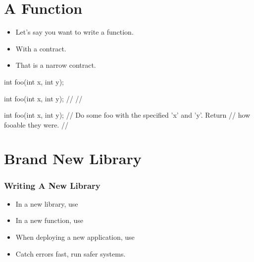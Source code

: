 \section{A Function}


\begin{frame}[fragile]
\begin{overprint}
  \begin{itemize}
  \item<1->{Let's say you want to write a function.}
  \item<3->{With a contract.}
  \item<5->{That is a narrow contract.}
  \end{itemize}
\end{overprint}

\begin{overprint}
\begin{cppcodebox}
int foo(int x, int y);
\end{cppcodebox}

\begin{cppcodebox}
int foo(int x, int y);
  // 
  // 
\end{cppcodebox}

\begin{cppcodebox}
int foo(int x, int y);
  // Do some foo with the specified 'x' and 'y'.  Return
  // how fooable they were. 
  // 
\end{cppcodebox}

\end{overprint}
\end{frame}

\section{Brand New Library}

\begin{frame}[fragile]
  \frametitle{Writing A New Library}
  \begin{itemize}\pause
  \item{In a new library, use } \pause
  \item{In a new function, use } \pause
  \item{When deploying a new application, use } \pause
  \end{itemize} 
  \begin{itemize}
  \item{Catch errors fast, run safer systems.}
  \end{itemize}
\end{frame}
    

